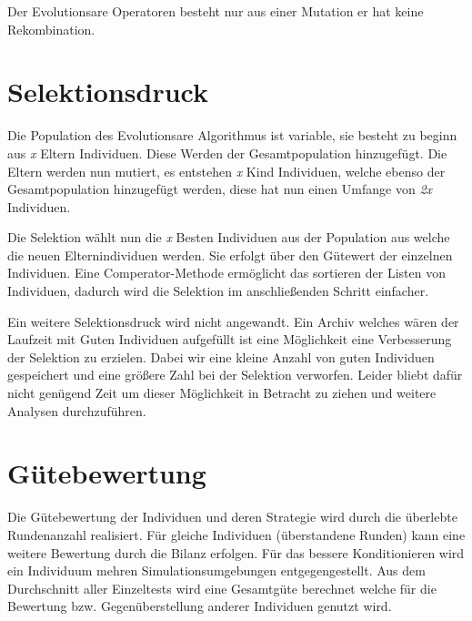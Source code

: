Der Evolutionsare Operatoren besteht nur aus einer Mutation er hat keine Rekombination.

\section{Selektionsdruck}
Die Population des Evolutionsare Algorithmus ist variable, sie besteht zu beginn aus \textit{x} Eltern Individuen. Diese Werden der Gesamtpopulation hinzugefügt. Die Eltern werden nun mutiert, es entstehen \textit{x} Kind Individuen, welche ebenso der Gesamtpopulation hinzugefügt werden, diese hat nun einen Umfange von \textit{2x} Individuen.

Die Selektion wählt nun die \textit{x} Besten Individuen aus der Population aus welche die neuen Elternindividuen werden. Sie erfolgt über den Gütewert der einzelnen Individuen. Eine Comperator-Methode ermöglicht das sortieren der Listen von Individuen, dadurch wird die Selektion im anschließenden Schritt einfacher.

Ein weitere Selektionsdruck wird nicht angewandt. Ein Archiv welches wären der Laufzeit mit Guten Individuen aufgefüllt ist eine Möglichkeit eine Verbesserung der Selektion zu erzielen. Dabei wir eine kleine Anzahl von guten Individuen gespeichert und eine größere Zahl bei der Selektion verworfen. Leider bliebt dafür nicht genügend Zeit um dieser Möglichkeit in Betracht zu ziehen und weitere Analysen durchzuführen.

\section{Gütebewertung}
Die Gütebewertung der Individuen und deren Strategie wird durch die überlebte Rundenanzahl realisiert. Für gleiche Individuen (überstandene Runden) kann eine weitere Bewertung durch die Bilanz erfolgen. Für das bessere Konditionieren wird ein Individuum mehren Simulationsumgebungen entgegengestellt. Aus dem Durchschnitt aller Einzeltests wird eine Gesamtgüte berechnet welche für die Bewertung bzw. Gegenüberstellung anderer Individuen genutzt wird.

